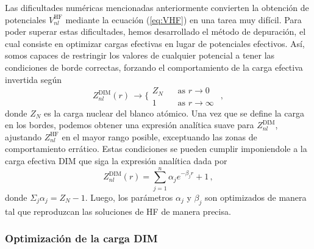 Las dificultades numéricas mencionadas anteriormente convierten la 
obtención de potenciales $V_{nl}^{\mathrm{HF}}$ mediante la ecuación 
(\ref{eq:VHF}) en una tarea muy difícil. Para poder superar estas 
dificultades, hemos desarrollado el método de depuración, el cual 
consiste en optimizar cargas efectivas en lugar de potenciales efectivos. 
Así, somos capaces de restringir los valores de cualquier potencial a 
tener las condiciones de borde correctas, forzando el comportamiento de 
la carga efectiva invertida según
\begin{equation}
Z_{nl}^{\mathrm{DIM}}(r) \, \rightarrow 
\bigg\{ 
\begin{array}{ll}
Z_{N}  \ \  & \ \ \text{as\ \ }r  \rightarrow 0\  \\ 
1           & \ \ \text{as\ \ }r  \rightarrow \infty \ 
\end{array}\,,
\label{eq:Zasympt}
\end{equation}
donde $Z_N$ es la carga nuclear del blanco atómico. Una vez que se 
define la carga en los bordes, podemos obtener una expresión analítica
suave para $Z_{nl}^{\mathrm{DIM}}$, ajustando $Z_{nl}^{\mathrm{HF}}$ en
el mayor rango posible, exceptuando las zonas de comportamiento errático.
Estas condiciones se pueden cumplir imponiendole a la carga efectiva 
DIM que siga la expresión analítica dada por
\begin{equation}
Z_{nl}^{\mathrm{DIM}}(r)= \sum_{j=1}^{n}\alpha _{j}e^{-\beta _{j}r}+1 \, ,  
\label{eq:atomzDIM}
\end{equation}
donde $\Sigma _{j}\alpha _{j}=Z_{N}-1$. Luego, los parámetros $\alpha_j$ y 
$\beta_j$ son optimizados de manera tal que reproduzcan las soluciones 
de HF de manera precisa.

\subsubsection{Optimización de la carga DIM}
\label{subsec:optDIM}


